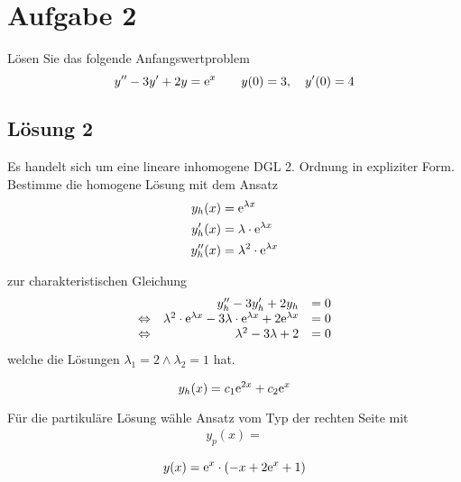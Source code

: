 \documentclass[main.tex]{subfiles}
\begin{document}
\section{Aufgabe 2}
Lösen Sie das folgende Anfangswertproblem
\begin{equation*}
    y'' - 3y' + 2y = \mathrm{e}^x \qquad y(0)=3, \quad y'(0)=4
\end{equation*}

\subsection{Lösung 2}
Es handelt sich um eine lineare inhomogene DGL 2. Ordnung in expliziter Form.
Bestimme die homogene Lösung mit dem Ansatz
\begin{align*}
    y_h(x) &= \mathrm{e}^{\lambda x} \\
    y_h'(x) &= \lambda\cdot \mathrm{e}^{\lambda x} \\
    y_h''(x) &= \lambda^2 \cdot \mathrm{e}^{\lambda x} \\
\end{align*}

zur charakteristischen Gleichung
\begin{equation*}
\begin{array}[pos]{rrl}
       & y_h'' - 3y_h' + 2y_h & = 0 \\
\Leftrightarrow & \lambda^2 \cdot \ct{e}^{\lambda x} - 3\lambda\cdot \ct{e}^{\lambda x} + 2\ct{e}^{\lambda x} &= 0\\
\Leftrightarrow & \lambda^2 - 3\lambda + 2 &= 0\\
\end{array}
\end{equation*}
welche die Lösungen $\lambda_1 = 2 \land \lambda_2 = 1$ hat.

$$
    y_h(x) = c_1 \mathrm{e}^{2x} + c_2 \mathrm{e}^{x}
$$

Für die partikuläre Lösung wähle Ansatz vom Typ der rechten Seite mit
\begin{align*}
    y_p(x) = 
\end{align*}


$$
    y(x) = \mathrm{e}^x \cdot \left(-x + 2 \mathrm{e}^x + 1\right)
$$
\end{document}
